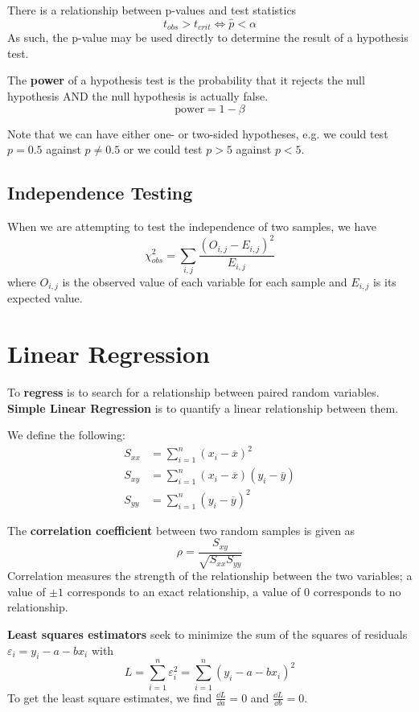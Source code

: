 \documentclass[12pt]{article}
\begin{document}
There is a relationship between p-values and test statistics \[ t_{obs} > t_{crit} \iff \hat{p} < \alpha \] As such, the p-value may be used directly to determine the result of a hypothesis test.

The {\bf power} of a hypothesis test is the probability that it rejects the null hypothesis AND the null hypothesis is actually false. \[ \text{power} = 1 - \beta \]

Note that we can have either one- or two-sided hypotheses, e.g. we could test $p = 0.5$ against $p \neq 0.5$ or we could test $p > 5$ against $p < 5$.

\subsection*{Independence Testing}
When we are attempting to test the independence of two samples, we have \[ \chi^2_{obs} = \sum_{i,j}\frac{(O_{i,j} - E_{i,j})^2}{E_{i,j}} \] where $O_{i,j}$ is the observed value of each variable for each sample and $E_{i,j}$ is its expected value.

\section*{Linear Regression}
To {\bf regress} is to search for a relationship between paired random variables. {\bf Simple Linear Regression} is to quantify a linear relationship between them.

We define the following:
\begin{align*}
S_{xx} &= \displaystyle\sum_{i=1}^n (x_i - \overline{x})^2\\
S_{xy} &= \displaystyle\sum_{i=1}^n (x_i - \overline{x})(y_i - \overline{y})\\
S_{yy} &= \displaystyle\sum_{i=1}^n (y_i - \overline{y})^2
\end{align*}

The {\bf correlation coefficient} between two random samples is given as \[ \rho = \frac{S_{xy}}{\sqrt{S_{xx}S_{yy}}} \] Correlation measures the strength of the relationship between the two variables; a value of $\pm 1$ corresponds to an exact relationship, a value of $0$ corresponds to no relationship.

{\bf Least squares estimators} seek to minimize the sum of the squares of residuals $\varepsilon_i = y_i - a - bx_i$ with \[ L = \sum_{i=1}^n \varepsilon^2_i = \sum_{i=1}^n (y_i - a - bx_i)^2 \] To get the least square estimates, we find $\frac{\dd L}{\dd a} = 0$ and $\frac{\dd L}{\dd b} = 0$.
\end{document}
